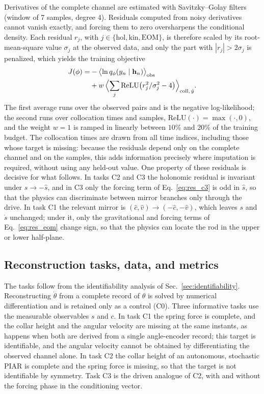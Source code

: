 Derivatives of the complete channel are estimated with Savitzky--Golay filters~\cite{SavitzkyGolay1964} (window of 7 samples, degree 4). Residuals computed from noisy derivatives cannot vanish exactly, and forcing them to zero oversharpens the conditional density. Each residual $r_j$, with $j\in\{\mathrm{hol},\mathrm{kin},\mathrm{EOM}\}$, is therefore scaled by its root-mean-square value $\sigma_j$ at the observed data, and only the part with $|r_j|>2\sigma_j$ is penalized, which yields the training objective
\begin{equation}
\begin{split}
J(\phi) = &-\bigl\langle\ln q_\phi(y_n\mid\mathbf h_n)\bigr\rangle_{\mathrm{obs}}\\
&+ w\,\Bigl\langle\sum_j \mathrm{ReLU}\bigl(r_j^{2}/\sigma_j^{2}-4\bigr)\Bigr\rangle_{\mathrm{coll},\,\hat y}.
\end{split}
\label{eq:loss}
\end{equation}
The first average runs over the observed pairs and is the negative log-likelihood; the second runs over collocation times and samples, $\mathrm{ReLU}(\cdot)=\max(\cdot,0)$, and the weight $w=1$ is ramped in linearly between $10\%$ and $20\%$ of the training budget. The collocation times are drawn from all time indices, including those whose target is missing: because the residuals depend only on the complete channel and on the samples, this adds information precisely where imputation is required, without using any held-out value. One property of these residuals is decisive for what follows. In tasks C2 and C3 the holonomic residual is invariant under $\hat s\to-\hat s$, and in C3 only the forcing term of Eq.~\eqref{eq:res_c3} is odd in $\hat s$, so that the physics can discriminate between mirror branches only through the drive. In task C1 the relevant mirror is $(\hat c,\hat v)\to(-\hat c,-\hat v)$, which leaves $s$ and $\dot s$ unchanged; under it, only the gravitational and forcing terms of Eq.~\eqref{eq:res_eom} change sign, so that the physics can locate the rod in the upper or lower half-plane.

\subsection{Reconstruction tasks, data, and metrics}\label{sec:tasks}

The tasks follow from the identifiability analysis of Sec.~\ref{sec:identifiability}. Reconstructing $\dot\theta$ from a complete record of $\theta$ is solved by numerical differentiation and is retained only as a control (C0). Three informative tasks use the measurable observables $s$ and $c$. In task C1 the spring force is complete, and the collar height and the angular velocity are missing at the same instants, as happens when both are derived from a single angle-encoder record; this target is identifiable, and the angular velocity cannot be obtained by differentiating the observed channel alone. In task C2 the collar height of an autonomous, stochastic PIAR is complete and the spring force is missing, so that the target is not identifiable by symmetry. Task C3 is the driven analogue of C2, with and without the forcing phase in the conditioning vector.

